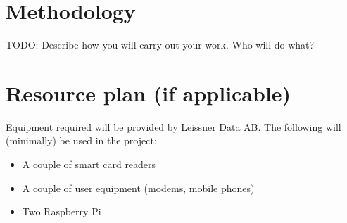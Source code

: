 \documentclass[12pt]{article}
\begin{document}
\section*{Methodology}
TODO: Describe how you will carry out your work. Who will do what?

\section*{Resource plan (if applicable)}
Equipment required will be provided by Leissner Data AB.
The following will (minimally) be used in the project:

\begin{itemize}
    \item A couple of smart card readers
    \item A couple of user equipment (modems, mobile phones)
    \item Two Raspberry Pi
\end{itemize}

\printbibliography[
    heading=bibintoc,
    title={References}
]
\end{document}
